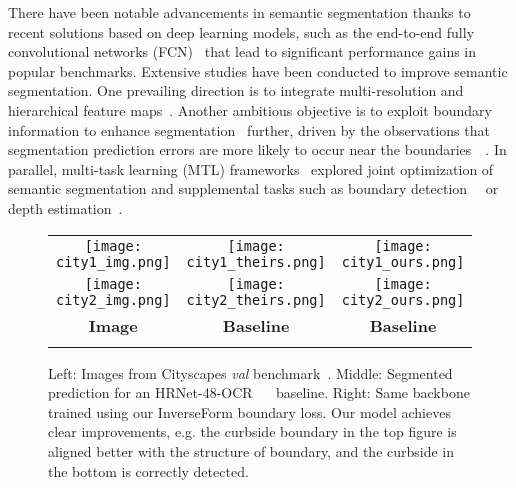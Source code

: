 \documentclass[final]{cvpr}
\def\inv#1{{\color{blue}{\bf {w/ ours}}}}
\begin{document}
There have been notable advancements in semantic segmentation thanks to recent solutions based on deep learning models, such as the end-to-end fully convolutional networks (FCN)~\cite{long2015fully} that lead to significant performance gains in popular benchmarks. Extensive studies have been conducted to improve semantic segmentation. One prevailing direction is to integrate multi-resolution and hierarchical feature maps~\cite{tao2020hierarchical}\cite{sun2019high}. Another ambitious objective is to exploit boundary information to enhance segmentation~\cite{yuan2020segfix}\cite{takikawa2019gated} further, driven by the observations that segmentation prediction errors are more likely to occur near the boundaries~\cite{takikawa2019gated}~\cite{pointrend}. In parallel, multi-task learning (MTL) frameworks~\cite{dvornik2017blitznet}\cite{maninis2019attentive} explored joint optimization of semantic segmentation and supplemental tasks such as boundary detection~\cite{dvornik2017blitznet}~\cite{vandenhende2020mti}\cite{maninis2019attentive} or depth estimation~\cite{xu2018pad}.

\begin{figure}[t]
\center
\begin{tabularx}{\textwidth}{c c c}
\hspace{-4mm}
\texttt{[image: city1\_img.png]} &
\hspace{-4mm}
\texttt{[image: city1\_theirs.png]} &
\hspace{-4mm}
\texttt{[image: city1\_ours.png]}  \\
\hspace{-4mm}
\texttt{[image: city2\_img.png]}  &
\hspace{-4mm}
\texttt{[image: city2\_theirs.png]}  &
\hspace{-4mm}
\texttt{[image: city2\_ours.png]}  \\
\hspace{-4mm}
\textbf{Image} & \hspace{-3mm} \textbf{Baseline} & \hspace{-3mm} \textbf{Baseline \inv{}} \\
\hspace{-2mm}

\end{tabularx}
\vspace{-2mm}
\caption{ Left: Images from Cityscapes \textit{val} benchmark~\cite{cordts2016cityscapes}. Middle: Segmented prediction for an HRNet-48-OCR~\cite{wang2020deep} ~\cite{yuan2020objectcontextual} baseline. Right: Same backbone trained using our InverseForm boundary loss. Our model achieves clear improvements, e.g. the curbside boundary in the top figure is aligned better with the structure of boundary, and the curbside in the bottom is correctly detected. 
} 
\label{fig:firstpage_cityscapes}
\end{figure}
\end{document}
